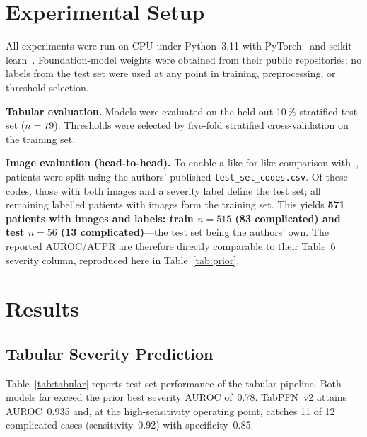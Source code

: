 \documentclass[journal]{IEEEtran}
\begin{document}
\section{Experimental Setup}
\label{sec:setup}
All experiments were run on CPU under Python~3.11 with PyTorch~\cite{paszke2019pytorch}
and scikit-learn~\cite{pedregosa2011scikit}. Foundation-model weights were obtained from
their public repositories; no labels from the test set were used at any point in
training, preprocessing, or threshold selection.

\textbf{Tabular evaluation.} Models were evaluated on the held-out 10\,\% stratified
test set ($n=79$). Thresholds were selected by five-fold stratified cross-validation on
the training set.

\textbf{Image evaluation (head-to-head).} To enable a like-for-like comparison
with~\cite{marcinkevics2024interpretable}, patients were split using the authors'
published \texttt{test\_set\_codes.csv}. Of these codes, those with both images and a
severity label define the test set; all remaining labelled patients with images form
the training set. This yields \textbf{571 patients with images and labels: train
$n=515$ (83 complicated) and test $n=56$ (13 complicated)}---the test set being the
authors' own. The reported AUROC/AUPR are therefore directly comparable to their
Table~6 severity column, reproduced here in Table~\ref{tab:prior}.

\section{Results}

\subsection{Tabular Severity Prediction}
Table~\ref{tab:tabular} reports test-set performance of the tabular pipeline. Both
models far exceed the prior best severity AUROC of~0.78. TabPFN~v2 attains AUROC~0.935
and, at the high-sensitivity operating point, catches 11 of 12 complicated cases
(sensitivity~0.92) with specificity~0.85.
\end{document}

